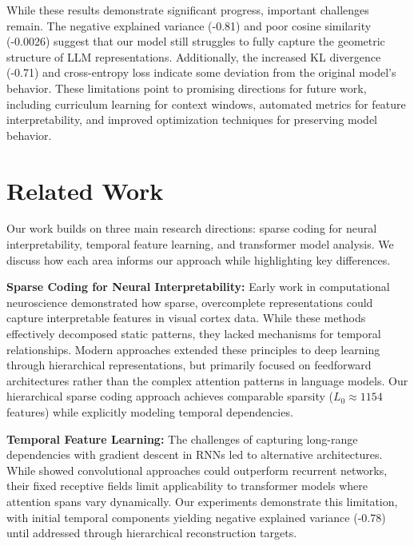 \documentclass{article} %
\begin{document}
While these results demonstrate significant progress, important challenges remain. The negative explained variance (-0.81) and poor cosine similarity (-0.0026) suggest that our model still struggles to fully capture the geometric structure of LLM representations. Additionally, the increased KL divergence (-0.71) and cross-entropy loss indicate some deviation from the original model's behavior. These limitations point to promising directions for future work, including curriculum learning for context windows, automated metrics for feature interpretability, and improved optimization techniques for preserving model behavior.

\section{Related Work}
\label{sec:related}

Our work builds on three main research directions: sparse coding for neural interpretability, temporal feature learning, and transformer model analysis. We discuss how each area informs our approach while highlighting key differences.

\textbf{Sparse Coding for Neural Interpretability:} Early work in computational neuroscience \cite{Olshausen1996EmergenceOS,Olshausen1996LearningEL} demonstrated how sparse, overcomplete representations could capture interpretable features in visual cortex data. While these methods effectively decomposed static patterns, they lacked mechanisms for temporal relationships. Modern approaches \cite{Bengio2007LearningDA} extended these principles to deep learning through hierarchical representations, but primarily focused on feedforward architectures rather than the complex attention patterns in language models. Our hierarchical sparse coding approach achieves comparable sparsity ($L_0 \approx 1154$ features) while explicitly modeling temporal dependencies.

\textbf{Temporal Feature Learning:} The challenges of capturing long-range dependencies with gradient descent in RNNs \cite{Bengio1994LearningLD} led to alternative architectures. While \cite{Bai2018AnEE} showed convolutional approaches could outperform recurrent networks, their fixed receptive fields limit applicability to transformer models where attention spans vary dynamically. Our experiments demonstrate this limitation, with initial temporal components yielding negative explained variance (-0.78) until addressed through hierarchical reconstruction targets.
\end{document}
